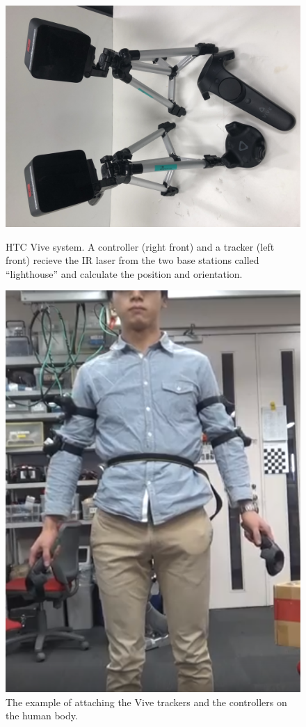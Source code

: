 \begin{figure}[htbp]
  \begin{minipage}{0.45\hsize}
    \begin{center}
      \includegraphics[angle=270, width=0.8\columnwidth]{figs/vive}
      \caption{HTC Vive system. A controller (right front) and a tracker (left front) recieve the IR laser from the two base stations called ``lighthouse'' and calculate the position and orientation.}
      \label{figure:vive}
    \end{center}
  \end{minipage}
  \begin{minipage}{0.45\hsize}
    \begin{center}
      \includegraphics[width=0.8\columnwidth]{figs/vive_limb}
      \caption{The example of attaching the Vive trackers and the controllers on the human body.}
      \label{figure:vive_on_body}
    \end{center}
  \end{minipage}
\end{figure}

